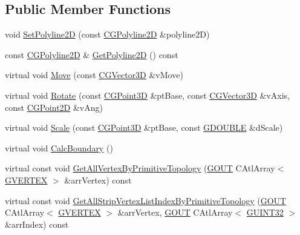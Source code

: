 \subsection*{Public Member Functions}
\begin{DoxyCompactItemize}
\item 
void \hyperlink{class_c_g_object_polyline2_d_a24bbb3efd8dfdc85840e404cfbc73510}{Set\+Polyline2\+D} (const \hyperlink{class_c_g_polyline2_d}{C\+G\+Polyline2\+D} \&polyline2\+D)
\item 
const \hyperlink{class_c_g_polyline2_d}{C\+G\+Polyline2\+D} \& \hyperlink{class_c_g_object_polyline2_d_ae741c6a97a3b951677a7bd547a92a3cc}{Get\+Polyline2\+D} () const 
\item 
virtual void \hyperlink{class_c_g_object_polyline2_d_ad683c6dad1c9b6756bf5f740b1e9e40b}{Move} (const \hyperlink{_g_point3_d_8h_aa7e73d39f4c991acb5a13c84b498366d}{C\+G\+Vector3\+D} \&v\+Move)
\item 
virtual void \hyperlink{class_c_g_object_polyline2_d_a8f0edaba36c2e89428a1420b99bbdaa3}{Rotate} (const \hyperlink{class_c_g_point3_d}{C\+G\+Point3\+D} \&pt\+Base, const \hyperlink{_g_point3_d_8h_aa7e73d39f4c991acb5a13c84b498366d}{C\+G\+Vector3\+D} \&v\+Axis, const \hyperlink{class_c_g_point2_d}{C\+G\+Point2\+D} \&v\+Ang)
\item 
virtual void \hyperlink{class_c_g_object_polyline2_d_a7bc7aa4790a526f01485a9218c6ce6f0}{Scale} (const \hyperlink{class_c_g_point3_d}{C\+G\+Point3\+D} \&pt\+Base, const \hyperlink{_g_types_8h_afd05ac85f90ee8e2a733928545462cd4}{G\+D\+O\+U\+B\+L\+E} \&d\+Scale)
\item 
virtual void \hyperlink{class_c_g_object_polyline2_d_aded40739d81eb4bc9254e5fa6c91896a}{Calc\+Boundary} ()
\item 
virtual const void \hyperlink{class_c_g_object_polyline2_d_a237ef2a60a0739643978528315e5ab85}{Get\+All\+Vertex\+By\+Primitive\+Topology} (\hyperlink{_g_types_8h_a0858ec221262e635612871d70ca233ad}{G\+O\+U\+T} C\+Atl\+Array$<$ \hyperlink{struct_g_v_e_r_t_e_x}{G\+V\+E\+R\+T\+E\+X} $>$ \&arr\+Vertex) const 
\item 
virtual const void \hyperlink{class_c_g_object_polyline2_d_a5dfe25aa9ef526041126c341aa47ebd5}{Get\+All\+Strip\+Vertex\+List\+Index\+By\+Primitive\+Topology} (\hyperlink{_g_types_8h_a0858ec221262e635612871d70ca233ad}{G\+O\+U\+T} C\+Atl\+Array$<$ \hyperlink{struct_g_v_e_r_t_e_x}{G\+V\+E\+R\+T\+E\+X} $>$ \&arr\+Vertex, \hyperlink{_g_types_8h_a0858ec221262e635612871d70ca233ad}{G\+O\+U\+T} C\+Atl\+Array$<$ \hyperlink{_g_types_8h_a2e1a1c77d1349057202e2f34e071019c}{G\+U\+I\+N\+T32} $>$ \&arr\+Index) const 

\end{DoxyCompactItemize}
